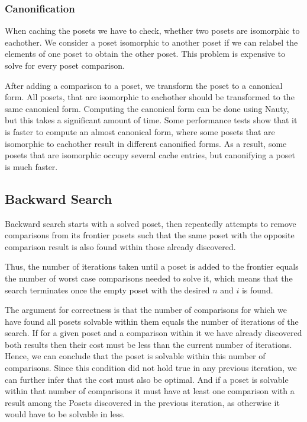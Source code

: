 \documentclass[10pt,journal,compsoc]{IEEEtran}
\begin{document}
\subsubsection{Canonification}

When caching the posets we have to check, whether two posets are isomorphic to eachother.
We consider a poset isomorphic to another poset if we can relabel the elements of one poset to obtain the other poset.
This problem is expensive to solve for every poset comparison.

After adding a comparison to a poset, we transform the poset to a canonical form.
All posets, that are isomorphic to eachother should be transformed to the same canonical form.
Computing the canonical form can be done using Nauty, but this takes a significant amount of time.
Some performance tests show that it is faster to compute an almost canonical form, where some posets that are isomorphic to eachother result in different canonified forms.
As a result, some posets that are isomorphic occupy several cache entries, but canonifying a poset is much faster.

\subsection{Backward Search} \label{sec:backward}

Backward search starts with a solved poset, then repeatedly attempts to remove comparisons from its
frontier posets such that the same poset with the opposite comparison result is also found within
those already discovered.

Thus, the number of iterations taken until a poset is added to the frontier equals the number of
worst case comparisons needed to solve it, which means that the search terminates once the empty
poset with the desired $n$ and $i$ is found.

The argument for correctness is that the number of comparisons for which we have found all posets solvable within them equals the number of iterations of the search.
If for a given poset and a comparison within it we have already discovered both results then their cost must be less than the current number of iterations. Hence, we can conclude that the poset is solvable within this number of comparisons.
Since this condition did not hold true in any previous iteration, we can further infer that the cost must also be optimal.
And if a poset is solvable within
that number of comparisons it must have at least one comparison with a result among the Posets
discovered in the previous iteration, as otherwise it would have to be solvable in less.
\end{document}
